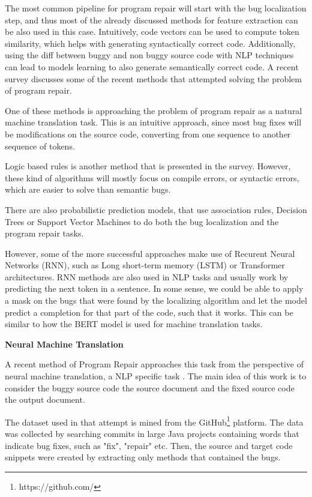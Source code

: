 \documentclass[12pt,a4paper]{report}
\begin{document}
The most common pipeline for program repair will start with the bug localization step, and thus most of the already discussed methods for feature extraction can be also used in this case. Intuitively, code vectors can be used to compute token similarity, which helps with generating syntactically correct code. Additionally, using the diff between buggy and non buggy source code with NLP techniques can lead to models learning to also generate semantically correct code. A recent survey \cite{sharma2021survey} discusses some of the recent methods that attempted solving the problem of program repair. 

One of these methods is approaching the problem of program repair as a natural machine translation task. This is an intuitive approach, since most bug fixes will be modifications on the source code, converting from one sequence to another sequence of tokens. 

Logic based rules is another method that is presented in the survey. However, these kind of algorithms will mostly focus on compile errors, or syntactic errors, which are easier to solve than semantic bugs.

There are also probabilistic prediction models, that use association rules, Decision Trees or Support Vector Machines to do both the bug localization and the program repair tasks. 

However, some of the more successful approaches make use of Recurent Neural Networks (RNN), such as Long short-term memory (LSTM) or Transformer architectures. RNN methods are also used in NLP tasks and usually work by predicting the next token in a sentence. In some sense, we could be able to apply a mask on the bugs that were found by the localizing algorithm and let the model predict a completion for that part of the code, such that it works. This can be similar to how the BERT model is used for machine translation tasks. 

\textbf{Neural Machine Translation}

A recent method of Program Repair approaches this task from the perspective of neural machine translation, a NLP specific task \cite{10.1145/3340544}. The main idea of this work is to consider the buggy source code the source document and the fixed source code the output document.

The dataset used in that attempt is mined from the GitHub\footnote{https://github.com/} platform. The data was collected by searching commits in large Java projects containing words that indicate bug fixes, such as "fix", "repair" etc. Then, the source and target code snippets were created by extracting only methods that contained the bugs.
\end{document}
